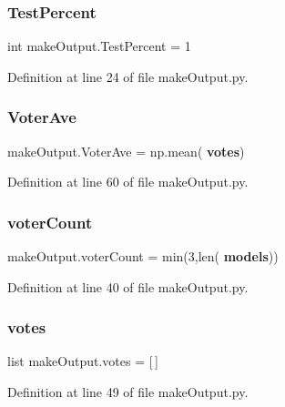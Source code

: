 \mbox{\label{namespacemake_output_afffb8a8671c3e222b9dfb7f4f9dd5e2c}} 
\subsubsection{Test\+Percent}
{\footnotesize\ttfamily int make\+Output.\+Test\+Percent = 1}



Definition at line 24 of file make\+Output.\+py.

\mbox{\label{namespacemake_output_a501dae6b7f2422348af7f0897959d960}} 
\subsubsection{Voter\+Ave}
{\footnotesize\ttfamily make\+Output.\+Voter\+Ave = np.\+mean(\textbf{ votes})}



Definition at line 60 of file make\+Output.\+py.

\mbox{\label{namespacemake_output_aada3dc59b2ac1099897d2ae0d7c00f9f}} 
\subsubsection{voter\+Count}
{\footnotesize\ttfamily make\+Output.\+voter\+Count = min(3,len(\textbf{ models}))}



Definition at line 40 of file make\+Output.\+py.

\mbox{\label{namespacemake_output_a0e99cf39c9a97e505c59c975b3d3f254}} 
\subsubsection{votes}
{\footnotesize\ttfamily list make\+Output.\+votes = [$\,$]}



Definition at line 49 of file make\+Output.\+py.

